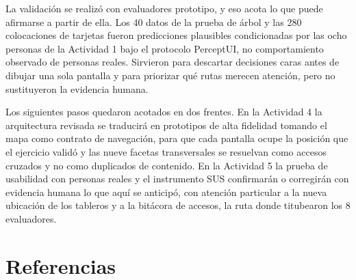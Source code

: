 La validación se realizó con evaluadores prototipo, y eso acota lo que puede afirmarse a partir de ella. Los 40 datos de la prueba de árbol y las 280 colocaciones de tarjetas fueron predicciones plausibles condicionadas por las ocho personas de la Actividad 1 bajo el protocolo PerceptUI, no comportamiento observado de personas reales. Sirvieron para descartar decisiones caras antes de dibujar una sola pantalla y para priorizar qué rutas merecen atención, pero no sustituyeron la evidencia humana.

Los siguientes pasos quedaron acotados en dos frentes. En la Actividad 4 la arquitectura revisada se traducirá en prototipos de alta fidelidad tomando el mapa como contrato de navegación, para que cada pantalla ocupe la posición que el ejercicio validó y las nueve facetas transversales se resuelvan como accesos cruzados y no como duplicados de contenido. En la Actividad 5 la prueba de usabilidad con personas reales y el instrumento SUS confirmarán o corregirán con evidencia humana lo que aquí se anticipó, con atención particular a la nueva ubicación de los tableros y a la bitácora de accesos, la ruta donde titubearon los 8 evaluadores.

\section{Referencias}

